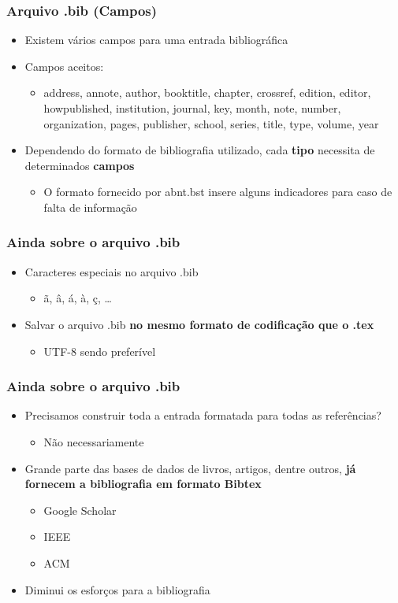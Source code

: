 \begin{frame}[fragile] \frametitle{Arquivo .bib (Campos)}
\begin{itemize}
	\item Existem vários campos para uma entrada bibliográfica
	\item Campos aceitos: 
	\begin{itemize}
		\item address, annote, author, booktitle, chapter, crossref, edition, editor, howpublished, institution, journal, key, month, note, number, organization, pages, publisher, school, series, title, type, volume, year
	\end{itemize}
	\item Dependendo do formato de bibliografia utilizado, cada \textbf{tipo} necessita de determinados \textbf{campos}
	\begin{itemize}
		\item O formato fornecido por abnt.bst insere alguns indicadores para caso de falta de informação
	\end{itemize}
\end{itemize}
\end{frame}

\begin{frame}[fragile] \frametitle{Ainda sobre o arquivo .bib}
\begin{itemize}
	\item Caracteres especiais no arquivo .bib
	\begin{itemize}
		\item ã, â, á, à, ç, \ldots
	\end{itemize}
	\item Salvar o arquivo .bib \textbf{no mesmo formato de codificação que o .tex}
	\begin{itemize}
		\item UTF-8 sendo preferível
	\end{itemize}
\end{itemize}
\end{frame}

\begin{frame}[fragile] \frametitle{Ainda sobre o arquivo .bib}
\begin{itemize}
	\item Precisamos construir toda a entrada formatada para todas as referências?
	\begin{itemize}
		\item Não necessariamente
	\end{itemize}
	\item Grande parte das bases de dados de livros, artigos, dentre outros, \textbf{já fornecem a bibliografia em formato Bibtex}
	\begin{itemize}
		\item Google Scholar
		\item IEEE
		\item ACM
	\end{itemize}
	\item Diminui os esforços para a bibliografia
\end{itemize}
\end{frame}

